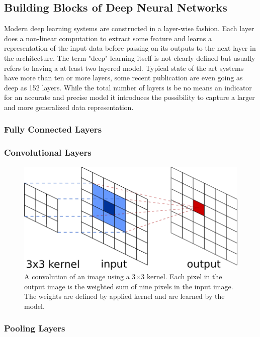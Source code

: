 \subsection{Building Blocks of Deep Neural Networks}
Modern deep learning systems are constructed in a layer-wise fashion. Each layer does a non-linear computation to extract some feature and learns a representation of the input data before passing on its outputs to the next layer in the architecture. The term "deep" learning itself is not clearly defined but usually refers to having a at least two layered model. Typical state of the art systems have more than ten or more layers, some recent publication\cite{he2016deep} are even going as deep as 152 layers. While the total number of layers is be no means an indicator for an accurate and precise model it introduces the possibility to capture a larger and more generalized data representation.

\subsubsection{Fully Connected Layers}
\subsubsection{Convolutional Layers}

	\begin{figure}[]
  		\centering
    	\includegraphics[width=\textwidth, keepaspectratio]{img/convolution.pdf}
    	\caption{A convolution of an image using a 3$\times$3 kernel. Each pixel in the output image is the weighted sum of nine pixels in the input image. The weights are defined by applied kernel and are learned by the model.}
    	\label{fig:convolution}
	\end{figure}

\subsubsection{Pooling Layers}

